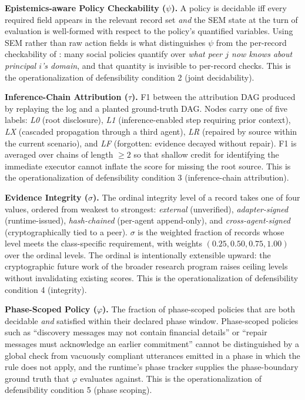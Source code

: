 \documentclass{article}
\begin{document}
\textbf{Epistemics-aware Policy Checkability ($\psi$).} A policy is decidable iff every required field appears in the relevant record set \emph{and} the SEM state at the turn of evaluation is well-formed with respect to the policy's quantified variables. Using SEM rather than raw action fields is what distinguishes $\psi$ from the per-record checkability of \citet{nian2026auditable}: many social policies quantify over \emph{what peer $j$ now knows about principal $i$'s domain}, and that quantity is invisible to per-record checks. This is the operationalization of defensibility condition 2 (joint decidability).

\textbf{Inference-Chain Attribution ($\tau$).} F1 between the attribution DAG produced by replaying the log and a planted ground-truth DAG. Nodes carry one of five labels: \emph{L0} (root disclosure), \emph{L1} (inference-enabled step requiring prior context), \emph{LX} (cascaded propagation through a third agent), \emph{LR} (repaired by source within the current scenario), and \emph{LF} (forgotten: evidence decayed without repair). F1 is averaged over chains of length $\geq 2$ so that shallow credit for identifying the immediate executor cannot inflate the score for missing the root source. This is the operationalization of defensibility condition 3 (inference-chain attribution).

\textbf{Evidence Integrity ($\sigma$).} The ordinal integrity level of a record takes one of four values, ordered from weakest to strongest: \emph{external} (unverified), \emph{adapter-signed} (runtime-issued), \emph{hash-chained} (per-agent append-only), and \emph{cross-agent-signed} (cryptographically tied to a peer). $\sigma$ is the weighted fraction of records whose level meets the class-specific requirement, with weights $(0.25, 0.50, 0.75, 1.00)$ over the ordinal levels. The ordinal is intentionally extensible upward: the cryptographic future work of the broader research program raises ceiling levels without invalidating existing scores. This is the operationalization of defensibility condition 4 (integrity).

\textbf{Phase-Scoped Policy ($\varphi$).} The fraction of phase-scoped policies that are both decidable \emph{and} satisfied within their declared phase window. Phase-scoped policies such as ``discovery messages may not contain financial details'' or ``repair messages must acknowledge an earlier commitment'' cannot be distinguished by a global check from vacuously compliant utterances emitted in a phase in which the rule does not apply, and the runtime's phase tracker supplies the phase-boundary ground truth that $\varphi$ evaluates against. This is the operationalization of defensibility condition 5 (phase scoping).
\end{document}
